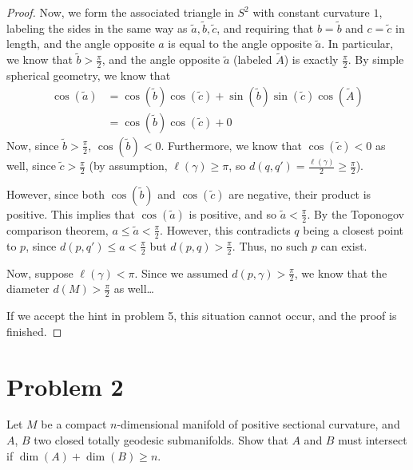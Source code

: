 \documentclass[fontsize=11pt]{scrartcl} %
\numberwithin{equation}{section} %
\numberwithin{figure}{section} %
\numberwithin{table}{section} %
\begin{document}
\begin{proof}
    Now, we form the associated triangle in $S^2$ with constant curvature $1$,
    labeling the sides in the same way as $\tilde{a},\tilde{b},\tilde{c}$, and
    requiring that $b = \tilde{b}$ and $c=\tilde{c}$ in length, and the angle
    opposite $a$ is equal to the angle opposite $\tilde{a}$. In
    particular, we know that $\tilde{b}>\frac{\pi}{2}$, and the angle opposite
    $\tilde{a}$ (labeled $\tilde{A}$) is exactly $\frac{\pi}{2}$. By simple
    spherical geometry, we know that
    \[
        \begin{aligned}
            \cos(\tilde{a}) &= \cos(\tilde{b})\cos(\tilde{c}) +
            \sin(\tilde{b})\sin(\tilde{c})\cos(\tilde{A})\\
            &= \cos(\tilde{b})\cos(\tilde{c}) + 0
        \end{aligned}
    \]
    Now, since $\tilde{b}>\frac{\pi}{2}$, $\cos(\tilde{b})<0$. Furthermore, we
    know that $\cos(\tilde{c})<0$ as well, since $\tilde{c}>\frac{\pi}{2}$ (by
        assumption, $\ell(\gamma)\geq \pi$, so
    $d(q,q')=\frac{\ell(\gamma)}{2}\geq \frac{\pi}{2}$).

    However, since both $\cos(\tilde{b})$ and $\cos(\tilde{c})$ are negative,
    their product is positive. This implies that $\cos(\tilde{a})$ is positive,
    and so $\tilde{a}<\frac{\pi}{2}$. By the Toponogov comparison theorem,
    $a\leq \tilde{a}<\frac{\pi}{2}$. However, this contradicts $q$ being a
    closest point to $p$, since $d(p,q')\leq a <\frac{\pi}{2}$ but
    $d(p,q)>\frac{\pi}{2}$. Thus, no such $p$ can exist.


    Now, suppose $\ell(\gamma)<\pi$. Since we assumed
    $d(p,\gamma)>\frac{\pi}{2}$, we know that the diameter $d(M)>\frac{\pi}{2}$
    as well\dots

    If we accept the hint in problem 5, this situation cannot occur, and the
    proof is finished.
\end{proof}

\newpage

\section*{Problem 2}
Let $M$ be a compact $n$-dimensional manifold of positive sectional curvature,
and $A$, $B$ two closed totally geodesic submanifolds. Show that $A$ and $B$
must intersect if $\dim(A) + \dim(B)\geq n$.
\end{document}
